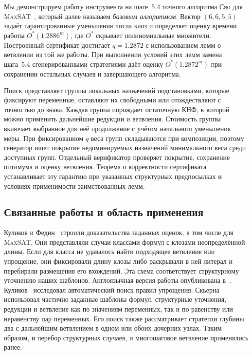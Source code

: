 \documentclass[10pt,twoside]{article}
\newcommand{\MaxSAT}{\textnormal{\textsc{MaxSAT}}}
\newcommand{\OhStar}{O^*}
\theoremstyle{definition}
\theoremstyle{remark}
\begin{document}
Мы демонстрируем работу инструмента на шаге~5.4 точного алгоритма Сяо
для \MaxSAT{}~\cite{Xiao2022}, который далее называем \emph{базовым
алгоритмом}. Вектор $(6,6,5,5)$ задаёт гарантированные уменьшения числа
клоз и определяет оценку времени работы $\OhStar(1.2886^m)$, где
$\OhStar$ скрывает полиномиальные множители. Построенный сертификат
достигает $q=1.2872$ с использованием лемм о ветвлении из той же работы.
При выполнении условий этих лемм замена шага~5.4 сгенерированными
стратегиями даёт оценку $\OhStar(1.2872^m)$ при сохранении остальных
случаев и завершающего алгоритма.

Поиск представляет группы локальных назначений подстановками, которые
фиксируют переменные, оставляют их свободными или отождествляют с
точностью до знака. Каждая группа порождает остаточную КНФ, к которой
можно применить дальнейшие редукции и ветвления. Стоимость группы включает
выбранное для неё продолжение с учётом начального уменьшения меры.
При фиксированном $q$ веса групп складываются при композиции, поэтому
генератор ищет покрытие недоминируемых назначений минимального веса
среди доступных групп. Отдельный верификатор
проверяет покрытие, сохранение оптимума и оценку ветвления. Теорема о
корректности сертификата устанавливает эту гарантию при указанных
структурных предпосылках и условиях применимости заимствованных лемм.

\subsection{Связанные работы и область применения}
\label{sec:related}

Куликов и Федин~\cite[§§~3.1, 3.4]{KulikovFedinPOMI2004}
строили доказательства заданных оценок, в том числе для \MaxSAT{}.
Они представляли случаи классами формул с клозами неопределённой
длины. Если для класса не удавалось найти подходящее ветвление или
упрощение, они фиксировали длину клозы либо раскрывали в ней литерал
и перебирали размещения его вхождений. Эта схема соответствует
структурному уточнению наших шаблонов. Англоязычная версия
работы опубликована в~\cite{FedinKulikov2004}.
Куликов~\cite{Kulikov2005} исследовал
автоматический поиск правил упрощения. Скьерна~\cite[глава~8]{Skjernaa2004}
использовал частично заданные шаблоны формул, структурные уточнения,
редукции и ветвление как по значениям переменных, так и по равенству или
неравенству пар переменных. Его поиск также рассматривает стратегии
глубины два с дальнейшим ветвлением в одном или обоих дочерних узлах.
Таким образом, и перебор структурных случаев, и многошаговое ветвление
применялись ранее.
\end{document}
